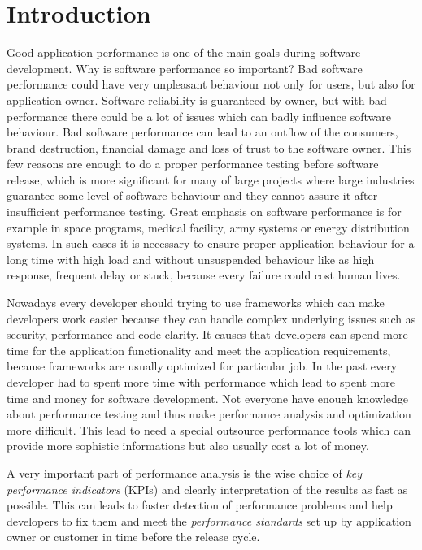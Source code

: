 
\chapter{Introduction}
Good application performance is one of the main goals during software development. Why is software performance so important? Bad software performance could have very unpleasant behaviour not only for users, but also for application owner. Software reliability is guaranteed by owner, but with bad performance there could be a lot of issues which can badly influence software behaviour. Bad software performance can lead to an outflow of the consumers, brand destruction, financial damage and loss of trust to the software owner. This few reasons are enough to do a proper performance testing before software release, which is more significant for many of large projects where large industries guarantee some level of software behaviour and they cannot assure it after insufficient performance testing. Great emphasis on software performance is for example in space programs, medical facility, army systems or energy distribution systems. In such cases it is necessary to ensure proper application behaviour for a long time with high load and without unsuspended behaviour like as high response, frequent delay or stuck, because every failure could cost human lives. 

Nowadays every developer should trying to use frameworks which can make developers work easier because they can handle complex underlying issues such as security, performance and code clarity. It causes that developers can spend more time for the application functionality and meet the application requirements, because frameworks are usually optimized for particular job. In the past every developer had to spent more time with performance which lead to spent more time and money for software development. Not everyone have enough knowledge about performance testing and thus make performance analysis and optimization more difficult. This lead to need a special outsource performance tools which can provide more sophistic informations but also usually cost a lot of money.

A very important part of performance analysis is the wise choice of \textit{key performance indicators} (KPIs)\cite{Molyneaux:TAoAPT} and clearly interpretation of the results as fast as possible. This can leads to faster detection of performance problems and help developers to fix them and meet the \textit{performance standards}\cite{Molyneaux:TAoAPT} set up by application owner or customer in time before the release cycle. 

